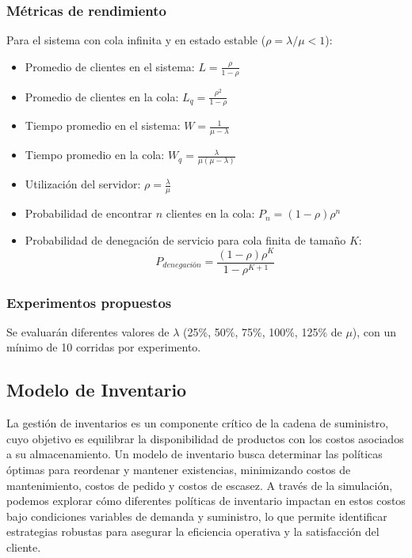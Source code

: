 \documentclass{article}
\begin{document}
\subsubsection*{Métricas de rendimiento}

Para el sistema con cola infinita y en estado estable (\( \rho = \lambda / \mu < 1 \)):

\begin{itemize}
    \item Promedio de clientes en el sistema: \( L = \frac{\rho}{1 - \rho} \)
    \item Promedio de clientes en la cola: \( L_q = \frac{\rho^2}{1 - \rho} \)
    \item Tiempo promedio en el sistema: \( W = \frac{1}{\mu - \lambda} \)
    \item Tiempo promedio en la cola: \( W_q = \frac{\lambda}{\mu(\mu - \lambda)} \)
    \item Utilización del servidor: \( \rho = \frac{\lambda}{\mu} \)
    \item Probabilidad de encontrar \( n \) clientes en la cola: \( P_n = (1 - \rho)\rho^n \)
    \item Probabilidad de denegación de servicio para cola finita de tamaño \( K \):
    \[
        P_{denegación} = \frac{(1 - \rho)\rho^K}{1 - \rho^{K+1}}
    \]
\end{itemize}

\subsubsection*{Experimentos propuestos}

Se evaluarán diferentes valores de \( \lambda \) (25\%, 50\%, 75\%, 100\%, 125\% de \( \mu \)), con un mínimo de 10 corridas por experimento.

\vspace{1em}

\subsection{Modelo de Inventario}
La gestión de inventarios es un componente crítico de la cadena de suministro, cuyo objetivo es equilibrar la disponibilidad de productos con los costos asociados a su almacenamiento. Un modelo de inventario busca determinar las políticas óptimas para reordenar y mantener existencias, minimizando costos de mantenimiento, costos de pedido y costos de escasez. A través de la simulación, podemos explorar cómo diferentes políticas de inventario impactan en estos costos bajo condiciones variables de demanda y suministro, lo que permite identificar estrategias robustas para asegurar la eficiencia operativa y la satisfacción del cliente.
\end{document}
